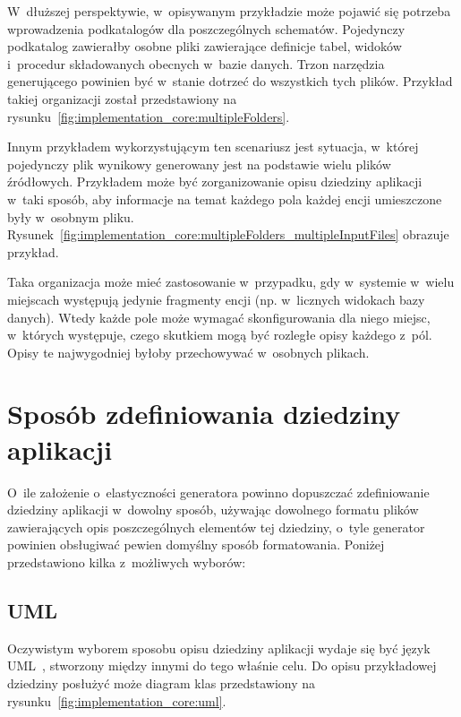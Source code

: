 W~dłuższej perspektywie, w~opisywanym przykładzie może pojawić się potrzeba wprowadzenia podkatalogów dla poszczególnych schematów.
Pojedynczy podkatalog zawierałby osobne pliki zawierające definicje tabel, widoków i~procedur składowanych obecnych w~bazie danych.
Trzon narzędzia generującego powinien być w~stanie dotrzeć do wszystkich tych plików.
Przykład takiej organizacji został przedstawiony na rysunku~\ref{fig:implementation_core:multipleFolders}.



Innym przykładem wykorzystującym ten scenariusz jest sytuacja, w~której pojedynczy plik wynikowy generowany jest na podstawie wielu plików źródłowych.
Przykładem może być zorganizowanie opisu dziedziny aplikacji w~taki sposób, aby informacje na temat każdego pola każdej encji umieszczone były w~osobnym pliku.
Rysunek~\ref{fig:implementation_core:multipleFolders_multipleInputFiles} obrazuje przykład.



Taka organizacja może mieć zastosowanie w~przypadku, gdy w~systemie w~wielu miejscach występują jedynie fragmenty encji (np. w~licznych widokach bazy danych).
Wtedy każde pole może wymagać skonfigurowania dla niego miejsc, w~których występuje, czego skutkiem mogą być rozległe opisy każdego z~pól.
Opisy te najwygodniej byłoby przechowywać w~osobnych plikach.



\section{Sposób zdefiniowania dziedziny aplikacji} \label{sec:core:domain_definition}

O~ile założenie o~elastyczności generatora powinno dopuszczać zdefiniowanie dziedziny aplikacji w~dowolny sposób, używając dowolnego formatu plików zawierających opis poszczególnych elementów tej dziedziny, o~tyle generator powinien obsługiwać pewien domyślny sposób formatowania.
Poniżej przedstawiono kilka z~możliwych wyborów:

\subsection{UML}

Oczywistym wyborem sposobu opisu dziedziny aplikacji wydaje się być język UML~\cite{uml}, stworzony między innymi do tego właśnie celu.
Do opisu przykładowej dziedziny posłużyć może diagram klas przedstawiony na rysunku~\ref{fig:implementation_core:uml}.


